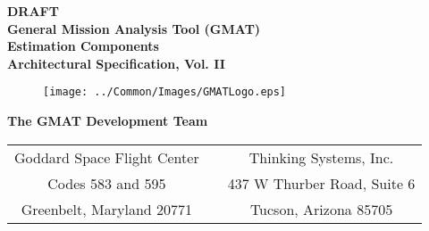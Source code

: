 \thispagestyle{empty}
\begin{center}
{\renewcommand{\thefootnote}{\fnsymbol{footnote}} { \huge \bf DRAFT
\\General Mission Analysis Tool (GMAT)\\ Estimation Components\\
Architectural Specification, Vol. II\\}
\vspace{0.1in} }
\end{center}

\begin{figure}[htbp!]
    \begin{center}
    \texttt{[image: ../Common/Images/GMATLogo.eps]}
    \end{center}
\end{figure}

\begin{center}
{\Large \bf The GMAT Development Team}\\
\vspace{0.1in}
\begin{tabular}{c c c}
  Goddard Space Flight Center & & Thinking Systems, Inc. \\
  Codes 583 and 595 & \hspace{0.3in} & 437 W Thurber Road, Suite 6 \\
  Greenbelt, Maryland 20771 & & Tucson, Arizona 85705 \\
\end{tabular}

\vspace{0.1in}{\today}

\end{center}

\clearpage \clearpage

